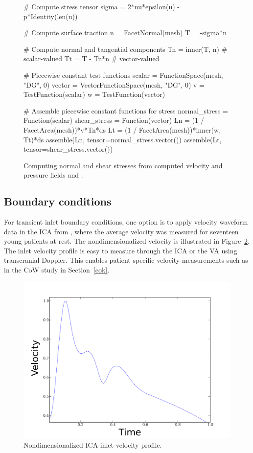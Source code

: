 \begin{figure}
\begin{python}
# Compute stress tensor
sigma = 2*nu*epsilon(u) - p*Identity(len(u))

# Compute surface traction
n = FacetNormal(mesh)
T = -sigma*n

# Compute normal and tangential components
Tn = inner(T, n) # scalar-valued
Tt = T - Tn*n    # vector-valued

# Piecewise constant test functions
scalar = FunctionSpace(mesh, "DG", 0)
vector = VectorFunctionSpace(mesh, "DG", 0)
v = TestFunction(scalar)
w = TestFunction(vector)

# Assemble piecewise constant functions for stress
normal_stress = Function(scalar)
shear_stress = Function(vector)
Ln = (1 / FacetArea(mesh))*v*Tn*ds
Lt = (1 / FacetArea(mesh))*inner(w, Tt)*ds
assemble(Ln, tensor=normal_stress.vector())
assemble(Lt, tensor=shear_stress.vector())
\end{python}
  \caption{Computing normal and shear stresses from computed
    velocity and pressure fields  and .}
\label{fig:kvs-2:stress_code}\end{figure}

\subsection{Boundary conditions} \label{resistance_bcs}

For transient inlet boundary conditions, one option is to apply
velocity waveform data in the ICA from \citet{FordAlperinLeeEtAl2005},
where the average velocity was measured for seventeen young patients
at rest. The nondimensionalized velocity is illustrated in
Figure~\ref{fig:kvs-2:ford}. The inlet velocity profile is easy to
measure through the ICA or the VA using transcranial Doppler. This
enables patient-specific velocity measurements such as in the CoW
study in Section~\ref{cok}.

\begin{figure}
  \centering
  \includegraphics[width=\largefig]{chapters/kvs-2/pdf/systolic.pdf}
   \caption{Nondimensionalized ICA inlet velocity profile.}
\label{fig:kvs-2:ford}
\end{figure}

